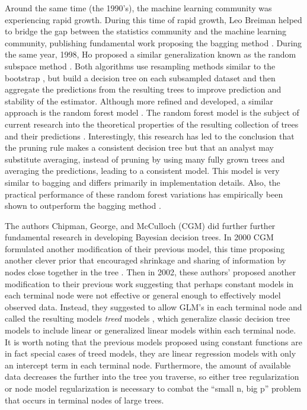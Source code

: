 Around the same time (the 1990's), the machine learning community was experiencing rapid growth. During this time of rapid growth, Leo Breiman helped to bridge the gap between the statistics community and the machine learning community, publishing fundamental work proposing the bagging method \cite{breiman1996bagging}. During the same year, 1998, Ho proposed a similar generalization known as the random subspace method \cite{ho1998random}. Both algorithms use resampling methods similar to the bootstrap \cite{efron1997improvements,efron1994introduction}, but build a decision tree on each subsampled dataset and then aggregate the predictions from the resulting trees to improve prediction and stability of the estimator. Although more refined and developed, a similar approach is the random forest model \cite{breiman2001random}. The random forest model is the subject of current research into the theoretical properties of the resulting collection of trees and their predictions \cite{biau2008consistency,biau2012analysis}. Interestingly, this research has led to the conclusion that the pruning rule makes a consistent decision tree but that an analyst may substitute averaging, instead of pruning by using many fully grown trees and averaging the predictions, leading to a consistent model.  This model is very similar to bagging and differs primarily in implementation details. Also, the practical performance of these random forest variations has empirically been shown to outperform the bagging method \cite{breiman2001random}. 

The authors Chipman, George, and McCulloch (CGM) \cite{chipman1998bayesian} did further further fundamental research in developing Bayesian decision trees. In 2000 CGM formulated another modification of their previous model, this time proposing another clever prior that encouraged shrinkage and sharing of information by nodes close together in the tree \cite{chipman2000hierarchical}. Then in 2002, these authors' proposed another modification to their previous work suggesting that perhaps constant models in each terminal node were not effective or general enough to effectively model observed data. Instead, they suggested to allow GLM's in each terminal node and called the resulting models \emph{treed} models \cite{chipman2002bayesian}, which generalize classic decision tree models to include linear or generalized linear models within each terminal node. It is worth noting that the previous models proposed using constant functions are in fact special cases of treed models, they are linear regression models with only an intercept term in each terminal node. Furthermore, the amount of available data decreases the further into the tree you traverse, so either tree regularization or node model regularization is necessary to combat the ``small n, big p'' problem that occurs in terminal nodes of large trees. 

